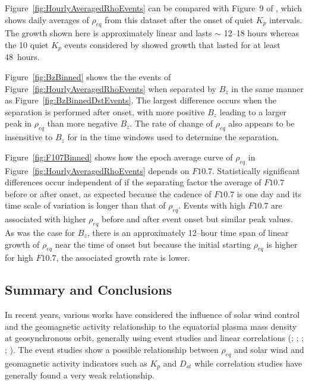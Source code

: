 \documentclass[12pt]{article}
\begin{document}
Figure~\ref{fig:HourlyAveragedRhoEvents} can be compared with Figure~9 of \cite{Denton2016}, which shows daily averages of $\rho_{eq}$ from this dataset after the onset of quiet $K_p$ intervals.  The growth shown here is approximately linear and lasts $\sim$ 12--18 hours whereas the 10 quiet $K_p$ events considered by \cite{Denton2016} showed growth that lasted for at least 48~hours. 

Figure~\ref{fig:BzBinned} shows the the events of Figure~\ref{fig:HourlyAveragedRhoEvents} when separated by $B_z$ in the same manner as Figure~\ref{fig:BzBinnedDstEvents}.  The largest difference occurs when the separation is performed after onset, with more positive $B_z$ leading to a larger peak in $\rho_{eq}$ than more negative $B_{z}$.  The rate of change of $\rho_{eq}$ also appears to be insensitive to $B_z$ for in the time windows used to determine the separation.  


Figure~\ref{fig:F107Binned} shows how the epoch average curve of $\rho_{eq}$ in Figure~\ref{fig:HourlyAveragedRhoEvents} depends on $F10.7$.  Statistically significant differences occur independent of if the separating factor the average of $F10.7$ before or after onset, as expected because the cadence of $F10.7$ is one day and its time scale of variation is longer than that of $\rho_{eq}$.  Events with high $F10.7$ are associated with higher $\rho_{eq}$ before and after event onset but similar peak values.  As was the case for $B_z$, there is an approximately 12--hour time span of linear growth of $\rho_{eq}$ near the time of onset but because the initial starting $\rho_{eq}$ is higher for high $F10.7$, the associated growth rate is lower.

\subsection{Summary and Conclusions}

In recent years, various works have considered the influence of solar wind control and the geomagnetic activity relationship to the equatorial plasma mass density at geosynchronous orbit, generally using event studies and linear correlations (\cite{Takahashi2006}; \cite{Denton2006}; \cite{Yao2008}; \cite{Takahashi2010}; \cite{Denton2016}).  The event studies show a possible relationship between $\rho_{eq}$ and solar wind and geomagnetic activity indicators such as $K_p$ and $D_{st}$ while correlation studies have generally found a very weak relationship.
\end{document}
